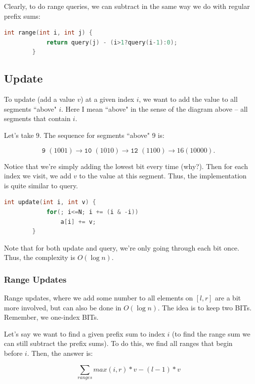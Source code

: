 \documentclass{article}
\begin{document}
        Clearly, to do range queries, we can subtract in the same way we do with regular prefix sums:
        
        \begin{lstlisting}[language=C++]
        int range(int i, int j) {
            return query(j) - (i>1?query(i-1):0);
        }
        \end{lstlisting}
    \subsection{Update}
        To update (add a value $v$) at a given index $i$, we want to add the value to all segments ``above" $i$. Here I mean ``above" in the sense of the diagram above -- all segments that contain $i$.
        
        Let's take $9$. The sequence for segments ``above" 9 is:
        
            $$ \texttt{9 }(1001)\rightarrow \texttt{10 }(1010) \rightarrow \texttt{12 }(1100) \rightarrow{16} (10000). $$
            
        Notice that we're simply adding the lowest bit every time (why?). Then for each index we visit, we add $v$ to the value at this segment. Thus, the implementation is quite similar to query. 
        \begin{lstlisting}[language=C++]
        int update(int i, int v) {
            for(; i<=N; i += (i & -i))
                a[i] += v;
        }
        \end{lstlisting}
        
    Note that for both update and query, we're only going through each bit once. Thus, the complexity is $O(\log n)$.
    
        \subsubsection{Range Updates}
            Range updates, where we add some number to all elements on $[l,r]$ are a bit more involved, but can also be done in $O(\log n)$. The idea is to keep two BITs. Remember, we one-index BITs.
            
            Let's say we want to find a given prefix sum to index $i$ (to find the range sum we can still subtract the prefix sums). To do this, we find all ranges that begin before $i$. Then, the answer is:
            
            $$ \sum_{ranges}{max(i, r)*v-(l-1)*v} $$
            
\end{document}
